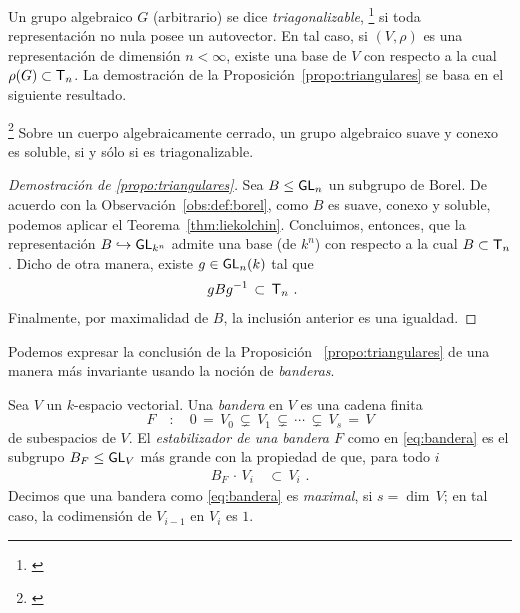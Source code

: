 Un grupo algebraico $G$ (arbitrario) se dice \emph{triagonalizable},%
\footnote{
	\cite[Definition~16.1]{MilneAlgebraicGroups}
}
si toda representaci\'{o}n no nula posee un autovector. En tal caso, si
$(V,\rho)$ es una representaci\'{o}n de dimensi\'{o}n $n<\infty$, existe una
base de $V$ con respecto a la cual $\rho(G)\subset\triangulares[n]$. La
demostraci\'{o}n de la Proposici\'{o}n~\ref{propo:triangulares} se basa en el
siguiente resultado.

\begin{teoLieKolchin}\label{thm:liekolchin}
	\footnote{
		\cite[Theorem~16.30]{MilneAlgebraicGroups}
	}
	Sobre un cuerpo algebraicamente cerrado, un grupo algebraico suave y
	conexo es soluble, si y s\'{o}lo si es triagonalizable.
\end{teoLieKolchin}

\begin{proof}[Demostraci\'{o}n de \ref{propo:triangulares}]
	Sea $B\leq\GL[n]$ un subgrupo de Borel. De acuerdo con la
	Observaci\'{o}n~\ref{obs:def:borel}, como $B$ es suave, conexo y
	soluble, podemos aplicar el Teorema~\ref{thm:liekolchin}. Concluimos,
	entonces, que la representaci\'{o}n $B\hookrightarrow\GL[k^n]$ admite
	una base (de $k^n$) con respecto a la cual $B\subset\triangulares[n]$.
	Dicho de otra manera, existe $g\in\GL[n](k)$ tal que
	\begin{align*}
		gBg^{-1} & \,\subset\,\triangulares[n]
		\text{ .}
	\end{align*}
	Finalmente, por maximalidad de $B$, la inclusi\'{o}n anterior es una
	igualdad.
\end{proof}

Podemos expresar la conclusi\'{o}n de la Proposici\'{o}n~%
\ref{propo:triangulares} de una manera m\'{a}s invariante usando la noci\'{o}n
de \emph{banderas}.

Sea $V$ un $k$-espacio vectorial. Una \emph{bandera} en $V$ es una cadena
finita
\begin{equation}
	\label{eq:bandera}
	F \quad:\quad 0\,=\,V_0\,\subsetneq\,V_1\,\subsetneq\,\cdots\,
		\subsetneq\,V_s\,=\,V
\end{equation}
%
de subespacios de $V$. El \emph{estabilizador de una bandera $F$} como en
\eqref{eq:bandera} es el subgrupo $B_F\leq\GL[V]$ m\'{a}s grande con la
propiedad de que, para todo $i$
\begin{align*}
	B_F\,\cdot\,V_i & \,\subset\,V_i
	\text{ .}
\end{align*}
%
Decimos que una bandera como \eqref{eq:bandera} es \emph{maximal}, si
$s=\dim\,V$; en tal caso, la codimensi\'{o}n de $V_{i-1}$ en $V_i$ es $1$.

